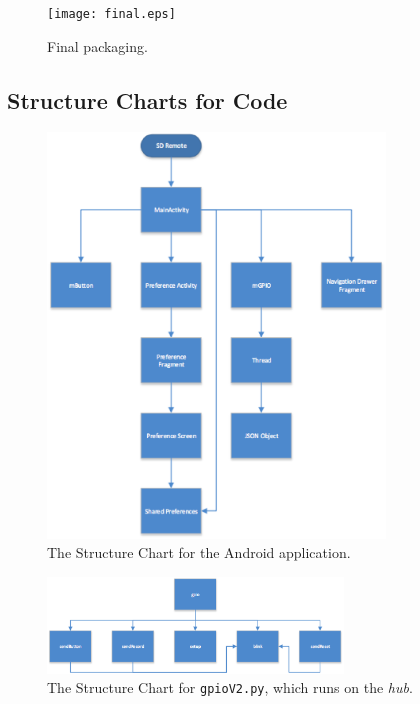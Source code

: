 \documentclass[12pt]{article}
\begin{document}
\begin{figure}[ht!]
\centering %
\texttt{[image: final.eps]} 
\caption{Final packaging.} \label{final}
\end{figure}


\subsection*{Structure Charts for Code}
\begin{figure}[ht!]
\centering %
\includegraphics[width=0.8\textwidth]{SD-SDR.eps} 
\caption{The Structure Chart for the Android application.} \label{sd-sdr}
\end{figure}

\begin{figure}[ht!]
\centering %
\includegraphics[width=0.7\textwidth]{SD-gpio.eps} 
\caption{The Structure Chart for \texttt{gpioV2.py}, which runs on the \emph{hub}.} \label{sd-gpio}
\end{figure}
\end{document}

